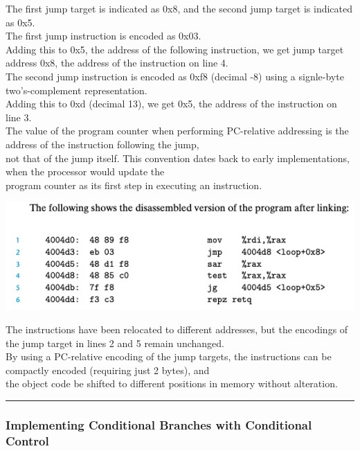 \documentclass[11pt]{article}
\begin{document}
The first jump target is indicated as 0x8, and the second jump target is indicated as 0x5.\\

The first jump instruction is encoded as 0x03.\\
Adding this to 0x5, the address of the following instruction, we get jump target address 0x8, the address of the instruction on line 4.\\

The second jump instruction is encoded as 0xf8 (decimal -8) using a signle-byte two's-complement representation.\\
Adding this to 0xd (decimal 13), we get 0x5, the address of the instruction on line 3.\\

The value of the program counter when performing PC-relative addressing is the address of the instruction following the jump,\\
not that of the jump itself. This convention dates back to early implementations, when the processor would update the\\
program counter as its first step in executing an instruction.\\

\begin{center}
\includegraphics[width=.9\linewidth]{pics/disassembled-version-after-linking.png}
\end{center}

The instructions have been relocated to different addresses, but the encodings of the jump target in lines 2 and 5 remain unchanged.\\
By using a PC-relative encoding of the jump targets, the instructions can be compactly encoded (requiring just 2 bytes), and\\
the object code be shifted to different positions in memory without alteration.\\

\noindent\rule{\textwidth}{0.5pt}


\subsubsection{Implementing Conditional Branches with Conditional Control}
\label{sec:org2508b2c}
\end{document}
